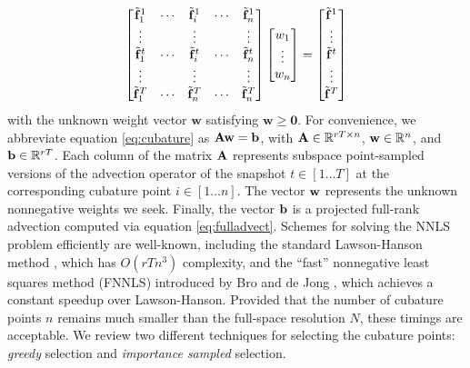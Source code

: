 {\begin{equation}
\label{eq:cubature}
\begin{bmatrix}
    \tilde{\mathbf{f}}_{1}^1       & \cdots & \tilde{\mathbf{f}}_{i}^{1} & \cdots & \tilde{\mathbf{f}}_{n}^1\\
    \vdots                 &              & \vdots            &             & \vdots\\
    \tilde{\mathbf{f}}_{1}^{t}     & \cdots  & \tilde{\mathbf{f}}_{i}^{t} & \cdots  & \tilde{\mathbf{f}}_{n}^t\\
    \vdots                 &              & \vdots            &             & \vdots\\
    \tilde{\mathbf{f}}_{1}^T      & \cdots   & \tilde{\mathbf{f}}_{n}^T & \cdots & \tilde{\mathbf{f}}_n^T
\end{bmatrix}
\begin{bmatrix}
	w_1\\
	\vdots\\
	w_n
\end{bmatrix}
=
\begin{bmatrix}
	\tilde{\mathbf{f}}^1\\
	\vdots\\
	\tilde{\mathbf{f}}^t\\
	\vdots\\
	\tilde{\mathbf{f}}^T
\end{bmatrix}
\end{equation}
with the unknown weight vector $\mathbf{w}$ satisfying $\mathbf{w} \geq \mathbf{0}$. For convenience,
we abbreviate equation \ref{eq:cubature} as $\mathbf{A} \mathbf{w} = \mathbf{b}$, with $\mathbf{A} \in \mathbb{R}^{rT \times n}$, $\mathbf{w} \in \mathbb{R}^n$, and $\mathbf{b} \in \mathbb{R}^{rT}$. Each column of the matrix $\mathbf{A}$ represents subspace point-sampled versions 
of the advection operator of the snapshot $t \in [1 \dots T]$ at the corresponding cubature point $i \in [1 \dots n]$. The vector $\mathbf{w}$ represents the unknown nonnegative weights we seek. Finally, the vector $\mathbf{b}$
is a projected full-rank advection computed via equation \ref{eq:fulladvect}. Schemes for solving the NNLS problem efficiently are well-known, including the standard Lawson-Hanson method \cite{lawson1995solving}, which has $O(rTn^3)$ complexity, and the ``fast'' nonnegative least squares method (FNNLS) introduced by Bro and de Jong \cite{bro1997fast}, which achieves a constant speedup over Lawson-Hanson. Provided that the number of cubature points $n$ remains much smaller than the full-space resolution $N$, these timings are acceptable. We review two different techniques for selecting the cubature points: {\em greedy} selection and {\em importance sampled} selection.
}
